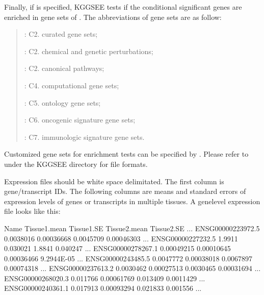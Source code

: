 \documentclass[letterpaper,10pt,english,openany,oneside]{sphinxmanual}
\begin{document}
\sphinxAtStartPar
Finally, if  is specified, KGGSEE tests if the conditional significant genes are enriched in gene sets of . The abbreviations of gene sets are as follow:
\begin{quote}

\begin{DUlineblock}{0em}
\item[] : C2. curated gene sets;
\item[]  : C2. chemical and genetic perturbations;
\item[] : C2. canonical pathways;
\item[] : C4. computational gene sets;
\item[] : C5. ontology gene sets;
\item[] : C6. oncogenic signature gene sets;
\item[] : C7. immunologic signature gene sets.
\end{DUlineblock}
\end{quote}

\sphinxAtStartPar
Customized gene sets for enrichment tests can be specified by . Please refer to  under the KGGSEE directory for file formats.

\sphinxAtStartPar
Expression files should be white space delimitated. The first column is gene/transcript IDs. The following columns are means and standard errors of expression levels of genes or transcripts in multiple tissues. A gene\sphinxhyphen{}level expression file looks like this:

\begin{sphinxVerbatim}[commandchars=\\\{\}]
Name                 Tissue1.mean   Tissue1.SE     Tissue2.mean   Tissue2.SE     ...
ENSG00000223972.5    0.0038016      0.00036668     0.0045709      0.00046303     ...
ENSG00000227232.5    1.9911         0.030021       1.8841         0.040247       ...
ENSG00000278267.1    0.00049215     0.00010645     0.00036466     9.2944E-05     ...
ENSG00000243485.5    0.0047772      0.00038018     0.0067897      0.00074318     ...
ENSG00000237613.2    0.0030462      0.00027513     0.0030465      0.00031694     ...
ENSG00000268020.3    0.011766       0.00061769     0.013409       0.0011429      ...
ENSG00000240361.1    0.017913       0.00093294     0.021833       0.001556       ...
\end{sphinxVerbatim}
\end{document}
